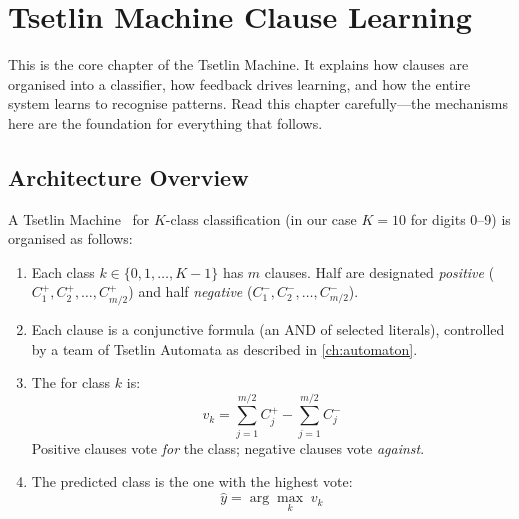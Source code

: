 \chapter{Tsetlin Machine Clause Learning}
\label{ch:clauses}

This is the core chapter of the Tsetlin Machine. It explains how
clauses are organised into a classifier, how feedback drives learning,
and how the entire system learns to recognise patterns. Read this
chapter carefully---the mechanisms here are the foundation for everything
that follows.


\section{Architecture Overview}
\label{sec:tm-architecture}

A Tsetlin Machine~\cite{granmo2018tsetlin} for $K$-class classification (in our case $K = 10$
for digits 0--9) is organised as follows:

\begin{enumerate}
  \item Each class $k \in \{0, 1, \ldots, K{-}1\}$ has $m$ clauses.
    Half are designated \emph{positive} ($C_1^+, C_2^+, \ldots,
    C_{m/2}^+$) and half \emph{negative} ($C_1^-, C_2^-, \ldots,
    C_{m/2}^-$).
  \item Each clause is a conjunctive formula (an AND of selected
    literals), controlled by a team of Tsetlin Automata as described
    in \cref{ch:automaton}.
  \item The  for class $k$ is:
    \begin{equation}
      v_k = \sum_{j=1}^{m/2} C_j^+ - \sum_{j=1}^{m/2} C_j^-
      \label{eq:clause-vote}
    \end{equation}
    Positive clauses vote \emph{for} the class; negative clauses
    vote \emph{against}.
  \item The predicted class is the one with the highest vote:
    \begin{equation}
      \hat{y} = \arg\max_k \; v_k
      \label{eq:predict}
    \end{equation}
\end{enumerate}


